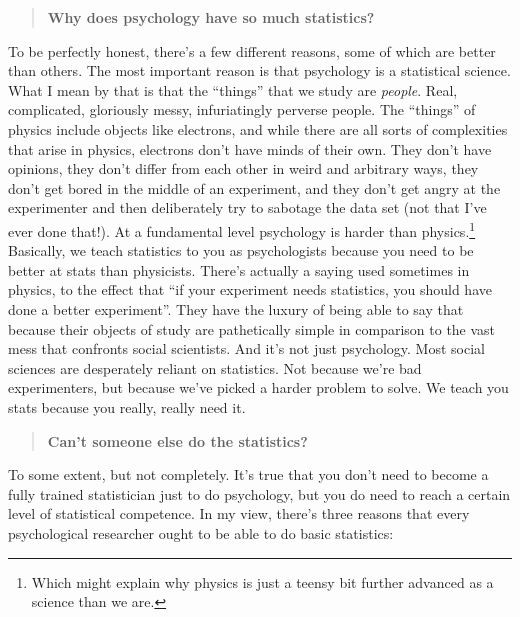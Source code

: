 \documentclass[
  a4paper,
]{book}
\begin{document}
\begin{quote}
\textbf{Why does psychology have so much statistics?}
\end{quote}

To be perfectly honest, there's a few different reasons, some of which
are better than others. The most important reason is that psychology is
a statistical science. What I mean by that is that the ``things'' that
we study are \emph{people}. Real, complicated, gloriously messy,
infuriatingly perverse people. The ``things'' of physics include objects
like electrons, and while there are all sorts of complexities that arise
in physics, electrons don't have minds of their own. They don't have
opinions, they don't differ from each other in weird and arbitrary ways,
they don't get bored in the middle of an experiment, and they don't get
angry at the experimenter and then deliberately try to sabotage the data
set (not that I've ever done that!). At a fundamental level psychology
is harder than physics.\footnote{Which might explain why physics is just
  a teensy bit further advanced as a science than we are.} Basically, we
teach statistics to you as psychologists because you need to be better
at stats than physicists. There's actually a saying used sometimes in
physics, to the effect that ``if your experiment needs statistics, you
should have done a better experiment''. They have the luxury of being
able to say that because their objects of study are pathetically simple
in comparison to the vast mess that confronts social scientists. And
it's not just psychology. Most social sciences are desperately reliant
on statistics. Not because we're bad experimenters, but because we've
picked a harder problem to solve. We teach you stats because you really,
really need it.

\begin{quote}
\textbf{Can't someone else do the statistics?}
\end{quote}

To some extent, but not completely. It's true that you don't need to
become a fully trained statistician just to do psychology, but you do
need to reach a certain level of statistical competence. In my view,
there's three reasons that every psychological researcher ought to be
able to do basic statistics:
\end{document}
